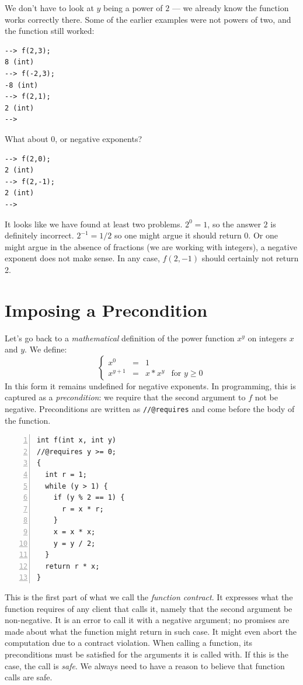 We don't have to look at $y$ being a power of $2$ --- we already know the
function works correctly there.  Some of the earlier examples were not powers
of two, and the function still worked:
\begin{lstlisting}[language={[coin]C}]
--> f(2,3);
8 (int)
--> f(-2,3);
-8 (int)
--> f(2,1);
2 (int)
-->
\end{lstlisting}
What about $0$, or negative exponents?
\begin{lstlisting}[language={[coin]C}]
--> f(2,0);
2 (int)
--> f(2,-1);
2 (int)
-->
\end{lstlisting}
It looks like we have found at least two problems.  $2^0 = 1$, so the answer
$2$ is definitely incorrect.  $2^{-1} = 1/2$ so one might argue it should
return $0$.  Or one might argue in the absence of fractions (we are working
with integers), a negative exponent does not make sense. In any case,
$f(2,-1)$ should certainly not return 2.


\clearpage
\section{Imposing a Precondition}
\label{sec:contracts:precondition}

Let's go back to a \emph{mathematical} definition of the power
function $x^y$ on integers $x$ and $y$.  We define:
$$
\left\{
\begin{array}{lcll}
  x^0 & = & 1 \\
  x^{y+1} & = & x * x^y & \mbox{for $y \geq 0$}
\end{array}
\right.
$$
In this form it remains undefined for negative exponents.
In programming, this is captured as a \emph{precondition}:
we require that the second argument to $f$ not be negative.
Preconditions are written as \lstinline'//@requires' and come
before the body of the function.

\begin{lstlisting}[language={[C0]C}, numbers=left]
int f(int x, int y)
//@requires y >= 0;
{
  int r = 1;
  while (y > 1) {
    if (y % 2 == 1) {
      r = x * r;
    }
    x = x * x;
    y = y / 2;
  }
  return r * x;
}
\end{lstlisting}

\noindent
This is the first part of what we call the \emph{function contract}.
It expresses what the function requires of any client that calls it,
namely that the second argument be non-negative.  It is an error to
call it with a negative argument; no promises are made about what the
function might return in such case.  It might even abort the
computation due to a contract violation.  When calling a function, its
preconditions must be satisfied for the arguments it is called with.
If this is the case, the call is \emph{safe}.  We always need to have
a reason to believe that function calls are safe.

